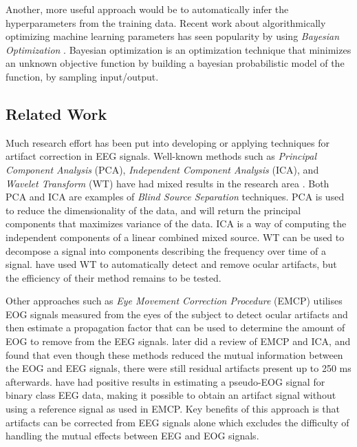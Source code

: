 Another, more useful approach would be to automatically infer the hyperparameters from the training data. Recent work about algorithmically optimizing machine learning parameters has seen popularity by using \emph{Bayesian Optimization} \citep{brochu2010tutorial,snoek2012practical,shahriari2016taking}. Bayesian optimization is an optimization technique that minimizes an unknown objective function by building a bayesian probabilistic model of the function, by sampling input/output. 


\subsection{Related Work}
Much research effort has been put into developing or applying techniques for artifact correction in EEG signals. Well-known methods such as \emph{Principal Component Analysis} (PCA), \emph{Independent Component Analysis} (ICA), and \emph{Wavelet Transform} (WT) have had mixed results in the research area \citep{uriguen2015eeg}. Both PCA and ICA are examples of \emph{Blind Source Separation} techniques. PCA is used to reduce the dimensionality of the data, and will return the principal components that maximizes variance of the data. ICA is a way of computing the independent components of a linear combined mixed source. WT can be used to decompose a signal into components describing the frequency over time of a signal. \cite{krishnaveni2006automatic} have used WT to automatically detect and remove ocular artifacts, but the efficiency of their method remains to be tested. 

Other approaches such as \emph{Eye Movement Correction Procedure} (EMCP) \citep{gratton1983new} utilises EOG signals measured from the eyes of the subject to detect ocular artifacts and then estimate a propagation factor that can be used to determine the amount of EOG to remove from the EEG signals. \cite{hoffmann2008correction} later did a review of EMCP and ICA, and found that even though these methods reduced the mutual information between the EOG and EEG signals, there were still residual artifacts present up to 250 ms afterwards. \cite{li2015ocular} have had positive results in estimating a pseudo-EOG signal for binary class EEG data, making it possible to obtain an artifact signal without using a reference signal as used in EMCP. Key benefits of this approach is that artifacts can be corrected from EEG signals alone which excludes the difficulty of handling the mutual effects between EEG and EOG signals.

